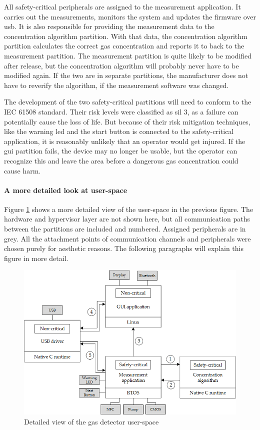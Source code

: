 All safety-critical peripherals are assigned to the measurement application. It carries out the measurements, monitors the system and updates the firmware over \acrshort{usb}. It is also responsible for providing the measurement data to the concentration algorithm partition. With that data, the concentration algorithm partition calculates the correct gas concentration and reports it to back to the measurement partition.  The measurement partition is quite likely to be modified after release, but the concentration algorithm will probably never have to be modified again. If the two are in separate partitions, the manufacturer does not have to reverify the algorithm, if the measurement software was changed.

The development of the two safety-critical partitions will need to conform to the IEC 61508 standard. Their risk levels were classified as \acrshort{sil} 3, as a failure can potentially cause the loss of life. But because of their risk mitigation techniques, like the warning \acrshort{led} and the start button is connected to the safety-critical application, it is reasonably unlikely that an operator would get injured. If the \acrshort{gui} partition fails, the device may no longer be usable, but the operator can recognize this and leave the area before a dangerous gas concentration could cause harm.

\paragraph{A more detailed look at user-space}
Figure \ref{fig:gas_detect_low_leve} shows a more detailed view of the user-space in the previous figure. The hardware and hypervisor layer are not shown here, but all communication paths between the partitions are included and numbered. Assigned peripherals are in grey. All the attachment points of communication channels and peripherals were chosen purely for aesthetic reasons. The following paragraphs will explain this figure in more detail.

\begin{figure}[ht!]
\centering
\includegraphics[scale=0.75]{Figures/gas_detect_low_level.png}
\decoRule
\caption{Detailed view of the gas detector user-space}
\label{fig:gas_detect_low_leve}
\end{figure}
